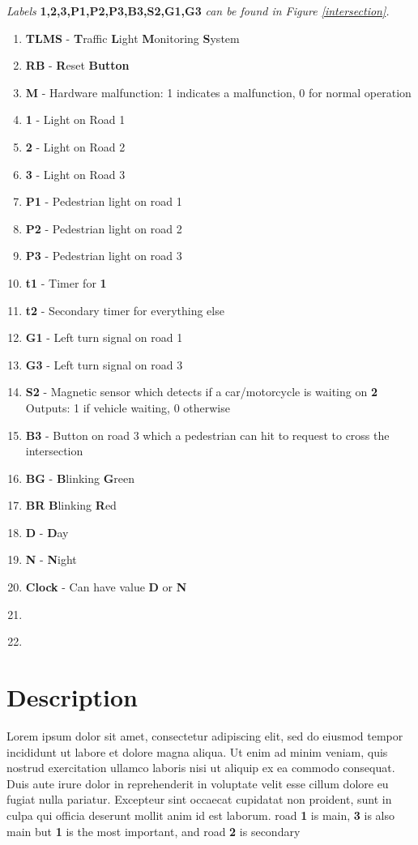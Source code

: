 \documentclass[letterpaper]{article}
\begin{document}
\textit{Labels}
\textbf{1,2,3,P1,P2,P3,B3,S2,G1,G3}
\textit{can be found in Figure \ref{intersection}.}
\begin{enumerate}

 \item \textbf{TLMS} -
       \textbf{T}raffic
       \textbf{L}ight
       \textbf{M}onitoring
       \textbf{S}ystem
       
 \item \textbf{RB} -
       \textbf{R}eset
       \textbf{Button}
 \item \textbf{M} - Hardware malfunction: 1 indicates a malfunction, 0 for normal operation
 \item \textbf{1} - Light on Road 1
 \item \textbf{2} - Light on Road 2
 \item \textbf{3} - Light on Road 3
 \item \textbf{P1} - Pedestrian light on road 1
 \item \textbf{P2} - Pedestrian light on road 2
 \item \textbf{P3} - Pedestrian light on road 3
 \item \textbf{t1} - Timer for \textbf{1}
 \item \textbf{t2} - Secondary timer for everything else
 \item \textbf{G1} - Left turn signal on road 1
 \item \textbf{G3} - Left turn signal on road 3
 \item \textbf{S2} - Magnetic sensor which detects if a car/motorcycle is waiting on \textbf{2}\\
       Outputs: 1 if vehicle waiting, 0 otherwise
 \item \textbf{B3} - Button on road 3 which a pedestrian can hit to request to cross the intersection
 \item \textbf{BG} -
       \textbf{B}linking
       \textbf{G}reen
 \item \textbf{BR}
       \textbf{B}linking
       \textbf{R}ed
 \item \textbf{D} - \textbf{D}ay
 \item \textbf{N} - \textbf{N}ight
 \item \textbf{Clock} - Can have value \textbf{D} or \textbf{N}
 \item \textbf{}
 \item \textbf{}
       
       
\end{enumerate}


\section{Description}
Lorem ipsum dolor sit amet, consectetur adipiscing elit, sed do eiusmod tempor
incididunt ut labore et dolore magna aliqua. Ut enim ad minim veniam, quis
nostrud exercitation ullamco laboris nisi ut aliquip ex ea commodo consequat.
Duis aute irure dolor in reprehenderit in voluptate velit esse cillum dolore eu
fugiat nulla pariatur. Excepteur sint occaecat cupidatat non proident, sunt in
culpa qui officia deserunt mollit anim id est laborum.
road \textbf{1} is main, \textbf{3} is also main but \textbf{1} is the most important, and
road \textbf{2} is secondary
\end{document}
